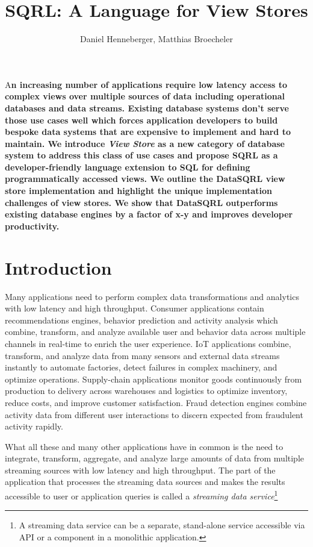\documentclass[	DIV=calc,%
							paper=letter,%
							fontsize=11pt,%
							twocolumn]{scrartcl}	 					%
\title{SQRL: A Language for View Stores}					%
\author{Daniel Henneberger, Matthias Broecheler }					%
\date{}																				%
\newcommand{\initial}[1]{%
     \lettrine[lines=3,lhang=0.3,nindent=0em]{
     				\color{sqrlPrimary}
     				{\textsf{#1}}}{}}
\begin{document}
\maketitle
\thispagestyle{fancy} 			%
\initial{A}\textbf{n increasing number of applications require low latency access to complex views over multiple sources of data including operational databases and data streams. Existing database systems don't serve those use cases well which forces application developers to build bespoke data systems that are expensive to implement and hard to maintain.
We introduce \emph{View Store} as a new category of database system to address this class of use cases and propose SQRL as a developer-friendly language extension to SQL for defining programmatically accessed views. We outline the DataSQRL view store implementation and highlight the unique implementation challenges of view stores. We show that DataSQRL outperforms existing database engines by a factor of x-y and improves developer productivity.}

\section{Introduction}

Many applications need to perform complex data transformations and analytics with low latency and high throughput. Consumer applications contain recommendations engines, behavior prediction and activity analysis which combine, transform, and analyze available user and behavior data across multiple channels in real-time to enrich the user experience. IoT applications combine, transform, and analyze data from many sensors and external data streams instantly to automate factories, detect failures in complex machinery, and optimize operations. Supply-chain applications monitor goods continuously from production to delivery across warehouses and logistics to optimize inventory, reduce costs, and improve customer satisfaction. Fraud detection engines combine activity data from different user interactions to discern expected from fraudulent activity rapidly.

What all these and many other applications have in common is the need to integrate, transform, aggregate, and analyze large amounts of data from multiple streaming sources with low latency and high throughput. The part of the application that processes the streaming data sources and makes the results accessible to user or application queries is called a \emph{streaming data service}\footnote{A streaming data service can be a separate, stand-alone service accessible via API or a component in a monolithic application.}
\end{document}
